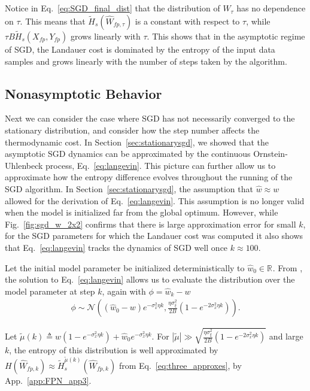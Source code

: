 \documentclass[12pt,onecolumn, margin=1in]{IEEEtran}
\newcommand{\paren}[1]{\left( #1 \right)}
\newcommand{\abs}[1]{\left| #1 \right|}
\newcommand{\R}[1]{\mathbb{R}^{#1}}
\newcommand{\gauss}[2]{\mathcal{N}\paren{#1, #2}}
\newcommand{\Wh}{\hat{W}}
\newcommand{\wh}{\hat{w}}
\newcommand{\sigx}{\sigma_x}
\newcommand{\sigxi}{\sigma_\xi}
\newcommand{\Ht}{\tilde{H}}
\newcommand{\Xfp}{X_{fp}}
\newcommand{\Yfp}{Y_{fp}}
\begin{document}
Notice in Eq.~\eqref{eq:SGD_final_dist} that the distribution of $\Wh_\tau$ has no dependence on $\tau$. This means that $\tilde H_s(\Wh_{fp,\tau})$ is a constant with respect to $\tau$, while $\tau B \Ht_s(\Xfp,\Yfp)$ grows linearly with $\tau$. This shows that in the asymptotic regime of SGD, the Landauer cost is dominated by the entropy of the input data samples and grows linearly with the number of steps taken by the algorithm.







\subsection{Nonasymptotic Behavior}\label{sec:nonstationarysgd}

Next we can consider the case where SGD has not necessarily converged to the stationary distribution, and consider how the step number affects the thermodynamic cost. In Section~\ref{sec:stationarysgd}, we showed that the asymptotic SGD dynamics can be approximated by the continuous Ornstein-Uhlenbeck process, Eq.~\eqref{eq:langevin}. This picture can further allow us to approximate how the entropy difference evolves throughout the running of the SGD algorithm. In Section~\ref{sec:stationarysgd}, the assumption that $\wh \approx w$ allowed for the derivation of Eq.~\eqref{eq:langevin}. This assumption is no longer valid when the model is initialized far from the global optimum. However, while Fig.~\ref{fig:sgd_w_2x2} confirms that there is large approximation error for small $k$, for the SGD parameters for which the Landauer cost was computed it also shows that Eq.~\eqref{eq:langevin} tracks the dynamics of SGD well once $k \approx 100$.

Let the initial model parameter be initialized deterministically to $\wh_0 \in \R{}$. From \cite{pavliotis2014stochasticprocesses}, the solution to Eq.~\eqref{eq:langevin} allows us to evaluate the distribution over the model parameter at step $k$, again with $\phi = \wh_k - w$
\begin{align}
    \phi \sim \gauss{(\wh_0-w) e^{-\sigx^2\eta k}}{\frac{\eta\sigxi^2}{2B}\paren{1 -e^{-2\sigx^2 \eta k}}}.
\end{align}

Let $\tilde \mu(k) \triangleq w\paren{1- e^{-\sigx^2\eta k}} + \wh_0 e^{-\sigx^2\eta k}$. For $\abs{\tilde \mu} \gg \sqrt{\frac{\eta\sigxi^2}{2B}\paren{1 -e^{-2\sigx^2 \eta k}}}$ and large $k$, the entropy of this distribution is well approximated by $H(\Wh_{fp,k}) \approx \Ht_s^{\tilde \mu(k)}(\Wh_{fp,k})$ from Eq.~\eqref{eq:three_approxes}, by App.~\ref{app:FPN_app3}.
\end{document}
